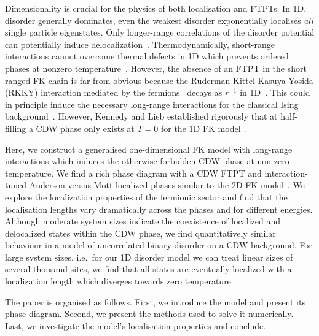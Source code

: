 Dimensionality is crucial for the physics of both localisation and FTPTs. In 1D, disorder generally dominates, even the weakest disorder exponentially localises \emph{all} single particle eigenstates. Only longer-range correlations of the disorder potential can potentially induce delocalization~\autocite{aubryAnalyticityBreakingAnderson1980,dassarmaLocalizationMobilityEdges1990,dunlapAbsenceLocalizationRandomdimer1990}. Thermodynamically, short-range interactions cannot overcome thermal defects in 1D which prevents ordered phases at nonzero temperature~\autocite{andersonAbsenceDiffusionCertain1958,goldshteinPurePointSpectrum1977,abrahamsScalingTheoryLocalization1979,kramerLocalizationTheoryExperiment1993}. However, the absence of an FTPT in the short ranged FK chain is far from obvious because the Ruderman-Kittel-Kasuya-Yosida (RKKY) interaction mediated by the fermions~\autocite{kasuyaTheoryMetallicFerro1956,rudermanIndirectExchangeCoupling1954,vanvleckNoteInteractionsSpins1962,yosidaMagneticPropertiesCuMn1957} decays as \(r^{-1}\) in 1D~\autocite{rusinCalculationRKKYRange2017a}. This could in principle induce the necessary long-range interactions for the classical Ising background~\autocite{thoulessLongRangeOrderOneDimensional1969,peierlsIsingModelFerromagnetism1936}. However, Kennedy and Lieb established rigorously that at half-filling a CDW phase only exists at \(T = 0\) for the 1D FK model~\autocite{kennedyItinerantElectronModel1986}.

Here, we construct a generalised one-dimensional FK model with long-range interactions which induces the otherwise forbidden CDW phase at non-zero temperature. We find a rich phase diagram with a CDW FTPT and interaction-tuned Anderson versus Mott localized phases similar to the 2D FK model~\autocite{antipovInteractionTunedAndersonMott2016}. We explore the localization properties of the fermionic sector and find that the localisation lengths vary dramatically across the phases and for different energies. Although moderate system sizes indicate the coexistence of localized and delocalized states within the CDW phase, we find quantitatively similar behaviour in a model of uncorrelated binary disorder on a CDW background. For large system sizes, i.e.~for our 1D disorder model we can treat linear sizes of several thousand sites, we find that all states are eventually localized with a localization length which diverges towards zero temperature.

The paper is organised as follows. First, we introduce the model and present its phase diagram. Second, we present the methods used to solve it numerically. Last, we investigate the model's localisation properties and conclude.

